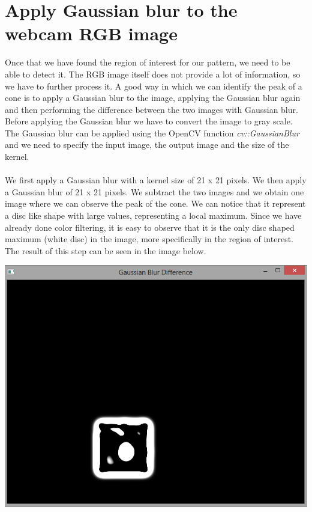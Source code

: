 \section{Apply Gaussian blur to the webcam RGB image}
\noindent
Once that we have found the region of interest for our pattern, we need to be able to detect it. The RGB image itself does not provide a lot of information, so we have to further process it. A good way in which we can identify the peak of a cone is to apply a Gaussian blur to the image, applying the Gaussian blur again and then performing the difference between the two images with Gaussian blur. Before applying the Gaussian blur we have to convert the image to gray scale.
\\
The Gaussian blur can be applied using the OpenCV function \emph{cv::GaussianBlur} and we need to specify the input image, the output image and the size of the kernel. 
\\\\
We first apply a Gaussian blur with a kernel size of 21 x 21 pixels. We then apply a Gaussian blur of 21 x 21 pixels. We subtract the two images and we obtain one image where we can observe the peak of the cone. We can notice that it represent a disc like shape with large values, representing a local maximum. Since we have already done color filtering, it is easy to observe that it is the only disc shaped maximum (white disc) in the image, more specifically in the region of interest.
The result of this step can be seen in the image below.

\begin{center}
	\includegraphics[scale=0.8]{images/gaussian_blur_difference.png}
	\label{fig:gauss_blur}
\end{center}

